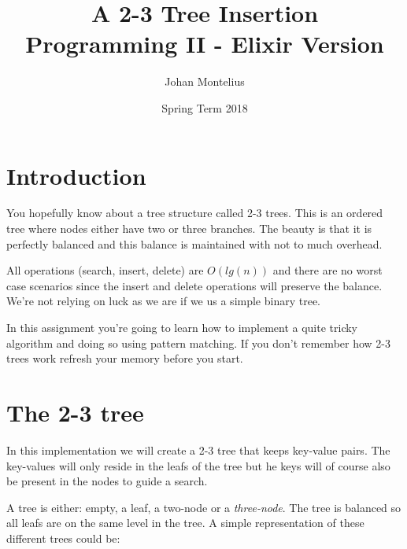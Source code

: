 \documentclass[a4paper,11pt]{article}
\begin{document}

\title{
    \textbf{A 2-3 Tree Insertion}\\
    \large{Programming II - Elixir Version}
}
\author{Johan Montelius}
\date{Spring Term 2018}
\maketitle
\thispagestyle{fancy}



\section*{Introduction}

You hopefully know about a tree structure called 2-3 trees. This is an
ordered tree where nodes either have two or three branches. The beauty
is that it is perfectly balanced and this balance is maintained with
not to much overhead. 

All operations (search, insert, delete) are $O(lg(n))$ and there are
no worst case scenarios since the insert and delete operations will
preserve the balance. We're not relying on luck as we are if we us a
simple binary tree.

In this assignment you're going to learn how to implement a quite
tricky algorithm and doing so using pattern matching. If you don't
remember how 2-3 trees work refresh your memory before you start.



\section{The 2-3 tree}

In this implementation we will create a 2-3 tree that keeps key-value
pairs. The key-values will only reside in the leafs of the tree but he
keys will of course also be present in the nodes to guide a search.

A tree is either: empty, a leaf, a two-node or a {\em three-node}. The
tree is balanced so all leafs are on the same level in the tree. A
simple representation of these different trees could be:
\end{document}

